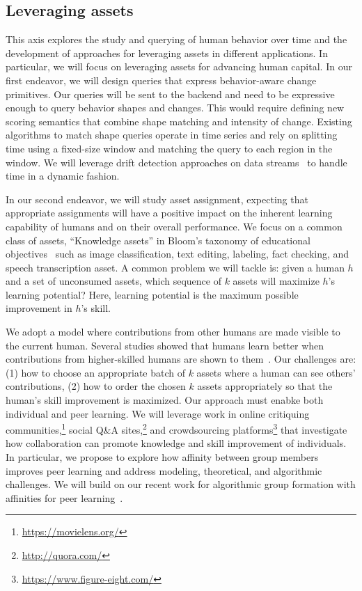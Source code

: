 \documentclass[11pt]{article}
\begin{document}
\subsection{Leveraging assets} 
This axis explores the study and querying of human behavior over time and the development of approaches for leveraging assets in different applications. In particular, we will focus on leveraging assets for advancing human capital. In our first endeavor, we will design queries that express behavior-aware change primitives. Our queries will be sent to the backend and need to be expressive enough to query behavior shapes and changes. This would require defining new scoring semantics that combine shape matching and intensity of change. Existing algorithms to match shape queries operate in time series and rely on splitting time using a fixed-size window and matching the query to each region in the window. We will leverage drift detection approaches on data streams~\cite{DBLP:conf/vldb/KiferBG04} to handle time in a dynamic fashion. 

In our second endeavor, we will study asset assignment, expecting that appropriate assignments will have a positive impact on the inherent learning capability of humans and on their overall performance.
We focus on a common class of assets, ``Knowledge assets'' in Bloom's taxonomy of educational objectives~\cite{Bloom56,KA09} such as image classification, text editing, labeling, fact checking, and speech transcription asset. A common problem we will tackle is: 
given a human $h$ and a set of unconsumed assets, which sequence of $k$ assets will maximize $h$'s learning potential? Here, learning potential is the maximum possible improvement in $h$'s skill.

We adopt a model where contributions from other humans are made visible to the current human. Several studies showed that humans learn better when contributions from higher-skilled humans are shown to them~\cite{DMB+14,DKB19,KIM15,KMM+18}. Our challenges are:
(1) how to choose an appropriate batch of $k$ assets where a human can see others' contributions, (2) how to order the chosen $k$ assets appropriately so that the human's skill improvement is maximized. Our approach must enabke both individual and peer learning. We will leverage work in online critiquing
communities,\footnote{\url{https://movielens.org/}} social Q\&A
sites,\footnote{\url{http://quora.com/}} and crowdsourcing
platforms\footnote{\url{https://www.figure-eight.com/}} that investigate how collaboration can promote knowledge and skill improvement of individuals. In particular, we propose
to explore how affinity between group members improves peer
learning and address modeling, theoretical, and algorithmic challenges. We will build on our recent work for algorithmic group formation with
affinities for peer learning~\cite{DBLP:conf/kdd/EsfandiariWAR19}.
\end{document}
